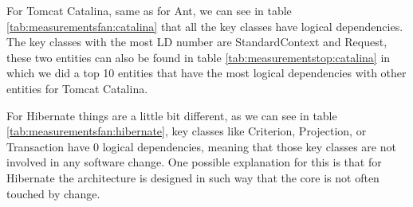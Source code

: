 \documentclass[12pt]{mitthesis}
\begin{document}
\begin{table}[!h]
\renewcommand{\arraystretch}{1}
\caption{Measurements for Ant key classes}
\label{tab:measurementsfan:ant}
\centering
{}
\end{table}


For Tomcat Catalina, same as for Ant, we can see in table \ref{tab:measurementsfan:catalina} that all the key classes have logical dependencies.  The key classes with the most LD number are StandardContext and Request, these two entities can also be found in table \ref{tab:measurementstop:catalina} in which we did a top 10 entities that have the most logical dependencies with other entities for Tomcat Catalina.

For Hibernate things are a little bit different, as we can see in table \ref{tab:measurementsfan:hibernate},  key classes like Criterion, Projection, or Transaction have 0 logical dependencies, meaning that those key classes are not involved in any software change. One possible explanation for this is that for Hibernate the architecture is designed in such way that the core is not often touched by change. 
\end{document}
